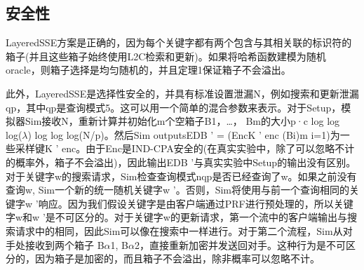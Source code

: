 \documentclass[UTF8]{article}
\begin{document}
\subsection{安全性}
LayeredSSE方案是正确的，因为每个关键字都有两个包含与其相关联的标识符的箱子(并且这些箱子始终使用L2C检索和更新)。如果将哈希函数建模为随机oracle，则箱子选择是均匀随机的，并且定理1保证箱子不会溢出。

此外，LayeredSSE是选择性安全的，并具有标准设置泄漏N，例如搜索和更新泄漏qp，其中qp是查询模式5。这可以用一个简单的混合参数来表示。对于Setup，模拟器Sim接收N，重新计算并初始化m个空箱子B1，…， Bm的大小p·c log log log($\lambda$) log log log(N/p)。然后Sim outputsEDB ' = (EncK ' enc (Bi)m i=1)为一些采样键K ' enc。由于Enc是IND-CPA安全的(在真实实验中，除了可以忽略不计的概率外，箱子不会溢出)，因此输出EDB '与真实实验中Setup的输出没有区别。对于关键字w的搜索请求，Sim检查查询模式nqp是否已经查询了w。如果之前没有查询w, Sim一个新的统一随机关键字w '。否则，Sim将使用与前一个查询相同的关键字w '响应。因为我们假设关键字是由客户端通过PRF进行预处理的，所以关键字w和w '是不可区分的。对于关键字w的更新请求，第一个流中的客户端输出与搜索请求中的相同，因此Sim可以像在搜索中一样进行。对于第二个流程，Sim从对手处接收到两个箱子 B$\alpha$1, B$\alpha$2，直接重新加密并发送回对手。这种行为是不可区分的，因为箱子是加密的，而且箱子不会溢出，除非概率可以忽略不计。
\end{document}
